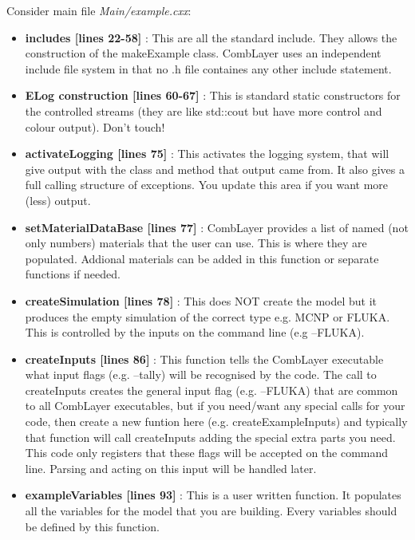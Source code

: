 Consider main file {\it Main/example.cxx}:
\begin{itemize}
\item{{\bf includes [lines 22-58]} : This are all the standard
  include. They allows the construction of the makeExample
  class. CombLayer uses an independent include file system in that no
  .h file containes any other include statement.}
  
\item{{\bf ELog construction [lines 60-67]} : This is standard static
  constructors for the controlled streams (they are like std::cout but
  have more control and colour output). Don't touch! }

\item{{\bf activateLogging [lines 75]} : This activates the logging
  system, that will give output with the class and method that output
  came from. It also gives a full calling structure of exceptions.
  You update this area if you want more (less) output.}

\item{{\bf setMaterialDataBase [lines 77]} : CombLayer provides a list
  of named (not only numbers) materials that the user can use. This
  is where they are populated. Addional materials can be added in this
  function or separate functions if needed.}

\item{{\bf createSimulation [lines 78]} : This does NOT create the model
  but it produces the empty simulation of the correct type e.g. MCNP or FLUKA.
  This is controlled by the inputs on the command line (e.g --FLUKA).}
  
\item{{\bf createInputs [lines 86]} : This function tells the CombLayer
  executable what input flags (e.g. --tally) will be
  recognised by the code.  The call to createInputs creates the general
  input flag (e.g. --FLUKA) that are common to all CombLayer executables,
  but if you need/want any special calls for your code,
  then create a new funtion here (e.g. createExampleInputs)
  and typically that function will call createInputs adding
  the special extra parts you need. This code only registers that these
  flags will be accepted on the command line. Parsing and acting on this input
  will be handled later.}
  
\item{{\bf exampleVariables [lines 93]} : This is a user written function.
  It populates all the variables for the model that you are building. Every variables should be defined by this function.}


\end{itemize}
